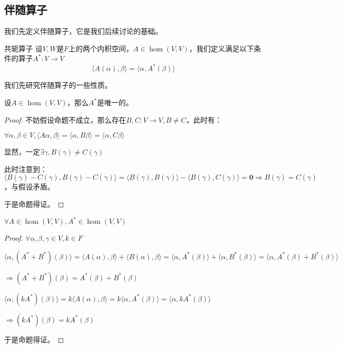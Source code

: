 \documentclass[12pt, a4paper, oneside, UTF8]{ctexbook}
\begin{document}
		\subsection{伴随算子}
			我们先定义伴随算子，它是我们后续讨论的基础。
			\begin{defn}{共轭算子}{}
				设$V,W$是$F$上的两个内积空间，$A \in \hom(V,V)$，我们定义满足以下条件的算子$A^* : V \to V$
				\begin{equation}
					\langle A(\alpha) ,\beta \rangle =\langle \alpha ,A^*(\beta) \rangle
				\end{equation}
			\end{defn}
			我们先研究伴随算子的一些性质。
			\begin{para}{0}
				\point{}
					\begin{proposition}
						设$A \in \hom(V,V)$，那么$A^*$是唯一的。
					\end{proposition}
					\begin{proof}
						不妨假设命题不成立，那么存在$B,C : V \to V,B \neq C$，此时有：

						$\forall \alpha ,\beta \in V,\langle A\alpha ,\beta \rangle =\langle \alpha ,B\beta \rangle =\langle \alpha ,C\beta \rangle$

						显然，一定$\exists \gamma ,B(\gamma )\neq C(\gamma )$

						此时注意到：$\langle B(\gamma )-C(\gamma ),B(\gamma )-C(\gamma )\rangle = \langle B(\gamma ),B(\gamma )\rangle - \langle B(\gamma ),C(\gamma )\rangle =\mathbf{0} \Rightarrow B(\gamma )=C(\gamma )$，与假设矛盾。

						于是命题得证。
					\end{proof}
				\point{}
					\begin{proposition}
						$\forall A \in \hom(V,V),A^* \in \hom(V,V)$
					\end{proposition}
					\begin{proof}
						$\forall \alpha ,\beta ,\gamma \in V,k \in F$

						$\langle \alpha ,(A^*+B^*)(\beta ) \rangle =\langle A(\alpha ),\beta \rangle +\langle B(\alpha ),\beta \rangle =\langle \alpha ,A^*(\beta ) \rangle +\langle \alpha ,B^*(\beta ) \rangle =\langle \alpha ,A^*(\beta )+B^*(\beta ) \rangle$

						$\Rightarrow (A^*+B^*)(\beta )=A^*(\beta )+B^*(\beta )$

						$\langle \alpha ,(kA^*)(\beta ) \rangle =k\langle A(\alpha ),\beta \rangle =k\langle \alpha ,A^*(\beta ) \rangle =\langle \alpha ,kA^*(\beta ) \rangle$

						$\Rightarrow (kA^*)(\beta )=kA^*(\beta )$

						于是命题得证。
					\end{proof}
			\end{para}
\end{document}
